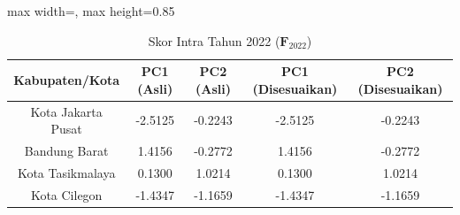 \begin{table}[H]
\centering
\caption{Skor Intra Tahun 2022 ($\mathbf{F}_{2022}$)} \label{tab:sample1skor_intra_2022}
\begin{adjustbox}{max width=\textwidth, max height=0.85\textheight}
\begin{tabular}{|c|c|c|c|c|}
\hline
\textbf{Kabupaten/Kota} & \textbf{PC1 (Asli)} & \textbf{PC2 (Asli)} & \textbf{PC1 (Disesuaikan)} & \textbf{PC2 (Disesuaikan)} \\
\hline
Kota Jakarta Pusat & -2.5125 & -0.2243 & -2.5125 & -0.2243 \\
Bandung Barat & 1.4156 & -0.2772 & 1.4156 & -0.2772 \\
Kota Tasikmalaya & 0.1300 & 1.0214 & 0.1300 & 1.0214 \\
Kota Cilegon & -1.4347 & -1.1659 & -1.4347 & -1.1659 \\
\hline
\end{tabular}
\end{adjustbox}
\end{table}